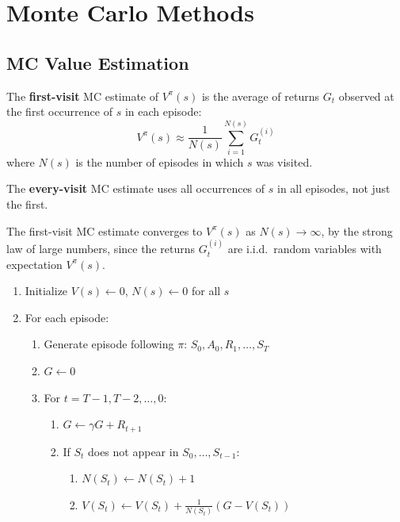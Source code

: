 \section{Monte Carlo Methods}

\subsection{MC Value Estimation}

\begin{definition}
The \textbf{first-visit} MC estimate of $V^\pi(s)$ is the average of returns
$G_t$ observed at the first occurrence of $s$ in each episode:
\[
    V^\pi(s) \approx \frac{1}{N(s)} \sum_{i=1}^{N(s)} G_t^{(i)}
\]
where $N(s)$ is the number of episodes in which $s$ was visited.
\end{definition}

\begin{definition}
The \textbf{every-visit} MC estimate uses all occurrences of $s$ in all
episodes, not just the first.
\end{definition}

\begin{theorem}
The first-visit MC estimate converges to $V^\pi(s)$ as $N(s) \to \infty$,
by the strong law of large numbers, since the returns $G_t^{(i)}$ are i.i.d.\
random variables with expectation $V^\pi(s)$.
\end{theorem}

\begin{algorithme}[title=\textbf{First-Visit MC Evaluation}]
\begin{enumerate}
    \item Initialize $V(s) \leftarrow 0$, $N(s) \leftarrow 0$ for all $s$
    \item For each episode:
    \begin{enumerate}
        \item Generate episode following $\pi$: $S_0, A_0, R_1, \ldots, S_T$
        \item $G \leftarrow 0$
        \item For $t = T-1, T-2, \ldots, 0$:
        \begin{enumerate}
            \item $G \leftarrow \gamma G + R_{t+1}$
            \item If $S_t$ does not appear in $S_0, \ldots, S_{t-1}$:
            \begin{enumerate}
                \item $N(S_t) \leftarrow N(S_t) + 1$
                \item $V(S_t) \leftarrow V(S_t) + \frac{1}{N(S_t)}(G - V(S_t))$
            \end{enumerate}
        \end{enumerate}
    \end{enumerate}
\end{enumerate}
\end{algorithme}

